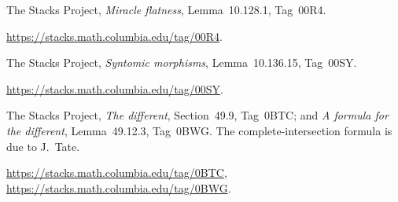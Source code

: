 The Stacks Project, \emph{Miracle flatness}, Lemma~10.128.1, Tag~00R4.\par
\url{https://stacks.math.columbia.edu/tag/00R4}.

The Stacks Project, \emph{Syntomic morphisms}, Lemma~10.136.15, Tag~00SY.\par
\url{https://stacks.math.columbia.edu/tag/00SY}.

The Stacks Project, \emph{The different}, Section~49.9, Tag~0BTC;
and \emph{A formula for the different}, Lemma~49.12.3,
Tag~0BWG.  The complete-intersection formula is due to J.~Tate.\par
\url{https://stacks.math.columbia.edu/tag/0BTC},
\url{https://stacks.math.columbia.edu/tag/0BWG}.
